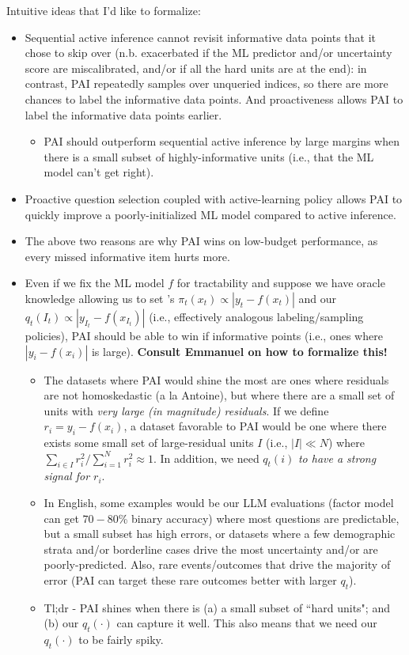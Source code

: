 \documentclass[11pt]{article}
\begin{document}
Intuitive ideas that I'd like to formalize:
\begin{itemize}
    \item Sequential active inference cannot revisit informative data points that it chose to skip over (n.b. exacerbated if the ML predictor and/or uncertainty score are miscalibrated, and/or if all the hard units are at the end): in contrast, PAI repeatedly samples over unqueried indices, so there are more chances to label the informative data points. And proactiveness allows PAI to label the informative data points earlier.
    \begin{itemize}
        \item PAI should outperform sequential active inference by large margins when there is a small subset of highly-informative units (i.e., that the ML model can't get right).
    \end{itemize}
    \item Proactive question selection coupled with active-learning policy allows PAI to quickly improve a poorly-initialized ML model compared to active inference.
    \item The above two reasons are why PAI wins on low-budget performance, as every missed informative item hurts more.
    \item Even if we fix the ML model $f$ for tractability and suppose we have oracle knowledge allowing us to set \cite{zrnic2024active}'s $\pi_t(x_t) \propto |y_t - f(x_t)|$ and our $q_t(I_t) \propto |y_{I_t} - f(x_{I_t})|$ (i.e., effectively analogous labeling/sampling policies), PAI should be able to win if informative points (i.e., ones where $|y_i - f(x_i)|$ is large). \textbf{Consult Emmanuel on how to formalize this!}
    \begin{itemize}
        \item The datasets where PAI would shine the most are ones where residuals are not homoskedastic (a la Antoine), but where there are a small set of units with \textit{very large (in magnitude) residuals}. If we define $r_i = y_i - f(x_i)$, a dataset favorable to PAI would be one where there exists some small set of large-residual units $I$ (i.e., $|I| \ll N$) where $\sum_{i \in I} r_i^2 / \sum_{i=1}^N r_i^2 \approx 1$. In addition, we need $q_t(i)$ \textit{to have a strong signal for $r_i$}.
        \item In English, some examples would be our LLM evaluations (factor model can get $70-80$\% binary accuracy) where most questions are predictable, but a small subset has high errors, or datasets where a few demographic strata and/or borderline cases drive the most uncertainty and/or are poorly-predicted. Also, rare events/outcomes that drive the majority of error (PAI can target these rare outcomes better with larger $q_t$).
        \item Tl;dr - PAI shines when there is (a) a small subset of ``hard units"; and (b) our $q_t(\cdot)$ can capture it well. This also means that we need our $q_t(\cdot)$ to be fairly spiky.
    \end{itemize}
\end{itemize}
\end{document}

